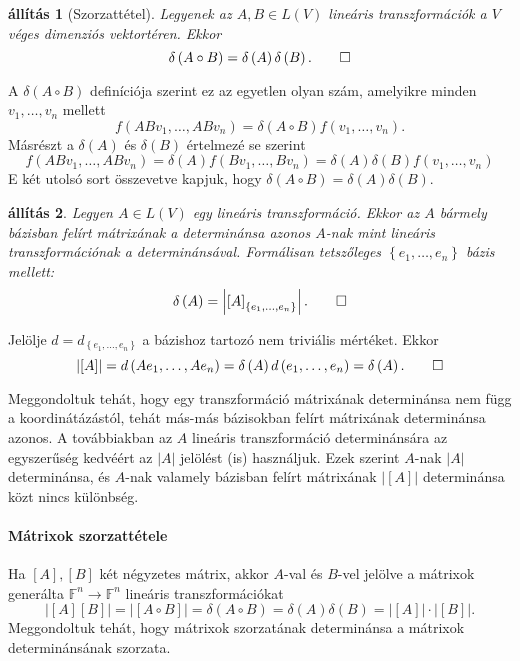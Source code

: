 \documentclass[a4paper, showtrims]{memoir}
\makeatletter
\renewenvironment{proof}[1][\proofname]
    {\par\pushQED{\qed}%
    \normalfont \topsep6\p@\@plus6\p@\relax
    \trivlist
    \item[\hskip\labelsep
        \itshape
    #1\@addpunct{:}]\ignorespaces}
    {\popQED\endtrivlist\@endpefalse}
\theoremstyle{plain}
\newtheorem{proposition}{állítás}[chapter]
\theoremstyle{remark}
\theoremstyle{definition}
\makeatother
\begin{document}
\begin{proposition}[Szorzattétel]
	Legyenek az $A,B\in L\left( V \right)$ lineáris transzformációk a $V$ véges dimenziós vektortéren.
	Ekkor
	\[
		\delta\left( A\circ B\right)
		=
		\delta\left( A\right) \delta\left( B\right).
		\qedhere
	\]
\end{proposition}
\begin{proof}
	A $\delta \left( A\circ B\right) $ definíciója szerint ez az egyetlen olyan
	szám, amelyikre minden $v_{1},\ldots ,v_{n}$ mellett
	\[
		f\left( ABv_{1},\ldots ,ABv_{n}\right) =\delta \left( A\circ B\right)
		f\left( v_{1},\ldots ,v_{n}\right) .
	\]
	Másrészt a $\delta \left( A\right) $ és $\delta \left( B\right) $ értelmezé%
	se szerint
	\[
		f\left( ABv_{1},\ldots ,ABv_{n}\right) =\delta \left( A\right) f\left(
		Bv_{1},\ldots ,Bv_{n}\right) =\delta \left( A\right) \delta \left( B\right)
		f\left( v_{1},\ldots ,v_{n}\right)
	\]
	E két utolsó sort összevetve kapjuk, hogy $\delta \left( A\circ B\right)
		=\delta \left( A\right) \delta \left( B\right) .$
\end{proof}

\begin{proposition}
	Legyen $A\in L\left( V\right)$ egy lineáris transzformáció.
	Ekkor az $A$ bármely bázisban felírt mátrixának a determinánsa azonos
	$A$-nak mint lineáris transzformációnak a determinánsával.
	Formálisan tetszőleges $\left\{ e_1,\ldots,e_n \right\}$ bázis mellett:
	\[
		\delta \left( A\right)
		=
		\left|
		\left[
			A
			\right]_{\left\{ e_{1},\ldots ,e_{n}\right\} }
		\right|.\qedhere
	\]
\end{proposition}
\begin{proof}
	Jelölje $d=d_{\left\{e_1,\ldots,e_n\right\}}$ a bázishoz tartozó nem triviális mértéket.
	Ekkor
	\[
		\left| \left[ A\right] \right| =d\left( Ae_{1},\ldots ,Ae_{n}\right) =\delta
		\left( A\right) d\left( e_{1},\ldots ,e_{n}\right) =\delta \left( A\right) . \qedhere
	\]
\end{proof}

Meggondoltuk tehát, hogy egy transzformáció mátrixának determinánsa nem függ a koordinátázástól,
tehát más-más bázisokban felírt mátrixának determinánsa azonos.
A továbbiakban az $A$ lineáris transzformáció determinánsára az egyszerűség kedvéért az $|A|$ jelölést (is) használjuk.
Ezek szerint $A$-nak $|A|$ determinánsa,
és $A$-nak valamely bázisban felírt mátrixának $|[A]|$ determinánsa közt nincs különbség.

\paragraph{Mátrixok szorzattétele}
Ha $[A],[B]$ két négyzetes mátrix,
akkor $A$-val és $B$-vel jelölve a
mátrixok generálta $\mathbb{F}^n\to\mathbb{F}^n$ lineáris transzformációkat
\[
	|[A][B]|=|[A\circ B]|=\delta\left( A\circ B \right)=\delta\left( A \right)\delta\left( B \right)=
	|[A]|\cdot|[B]|.
\]
Meggondoltuk tehát, hogy mátrixok szorzatának determinánsa a mátrixok determinánsának szorzata.
\end{document}
